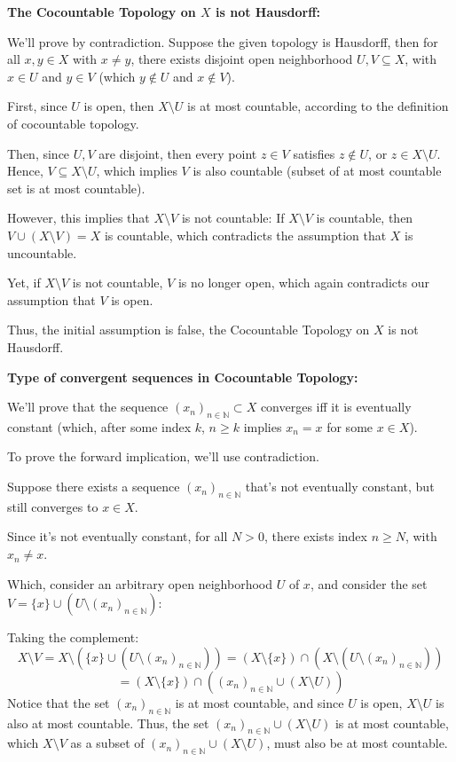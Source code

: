 \documentclass{article}
\begin{document}
\hfill

\hfill

\textbf{The Cocountable Topology on $X$ is not Hausdorff:}

We'll prove by contradiction. Suppose the given topology is Hausdorff, then for all $x,y\in X$ with $x\neq y$, there exists disjoint open neighborhood $U,V\subseteq X$,
with $x\in U$ and $y\in V$ (which $y\notin U$ and $x\notin V$).

First, since $U$ is open, then $X\setminus U$ is at most countable, according to the definition of cocountable topology.

Then, since $U,V$ are disjoint, then every point $z\in V$ satisfies $z\notin U$, or $z\in X\setminus U$. Hence, $V\subseteq X\setminus U$, which implies $V$ is also countable (subset of at most countable set is at most countable).

However, this implies that $X\setminus V$ is not countable: If $X\setminus V$ is countable, then $V\cup (X\setminus V)=X$ is countable, which contradicts the assumption that $X$ is uncountable.

Yet, if $X\setminus V$ is not countable, $V$ is no longer open, which again contradicts our assumption that $V$ is open.

Thus, the initial assumption is false, the Cocountable Topology on $X$ is not Hausdorff.

\hfill

\hfill

\textbf{Type of convergent sequences in Cocountable Topology:}

We'll prove that the sequence $(x_n)_{n\in\mathbb{N}}\subset X$ converges iff it is eventually constant (which, after some index $k$, $n\geq k$ implies $x_n=x$ for some $x\in X$).

\hfill

To prove the forward implication, we'll use contradiction.

Suppose there exists a sequence $(x_n)_{n\in\mathbb{N}}$ that's not eventually constant, but still converges to $x\in X$.

Since it's not eventually constant, for all $N>0$, there exists index $n\geq N$, with $x_n \neq x$. 

Which, consider an arbitrary open neighborhood $U$ of $x$, and consider the set $V=\{x\}\cup (U\setminus (x_n)_{n\in\mathbb{N}})$:

Taking the complement:
$$X\setminus V = X\setminus(\{x\}\cup (U\setminus (x_n)_{n\in\mathbb{N}})) = (X\setminus \{x\})\cap (X\setminus(U\setminus (x_n)_{n\in\mathbb{N}}))$$
$$= (X\setminus\{x\})\cap ((x_n)_{n\in\mathbb{N}}\cup (X\setminus U))$$
Notice that the set $(x_n)_{n\in\mathbb{N}}$ is at most countable, and since $U$ is open, $X\setminus U$ is also at most countable.
Thus, the set $(x_n)_{n\in\mathbb{N}}\cup (X\setminus U)$ is at most countable, which $X\setminus V$ as a subset of $(x_n)_{n\in\mathbb{N}}\cup (X\setminus U)$, must also be at most countable.
\end{document}
